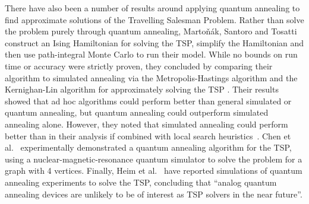 There have also been a number of results around applying quantum annealing to find approximate solutions of the Travelling Salesman Problem. Rather than solve the problem purely through quantum annealing, Marto\v{n}\'ak, Santoro and Tosatti \cite{martonak2004} construct an Ising Hamiltonian for solving the TSP, simplify the Hamiltonian and then use path-integral Monte Carlo \cite{barker1979} to run their model. While no bounds on run time or accuracy were strictly proven, they concluded by comparing their algorithm to simulated annealing via the Metropolis-Hastings algorithm \cite{metropolis1953} and the Kernighan-Lin algorithm for approximately solving the TSP \cite{kernighan1970}. Their results showed that ad hoc algorithms could perform better than general simulated or quantum annealing, but quantum annealing could outperform simulated annealing alone. However, they noted that simulated annealing could perform better than in their analysis if combined with local search heuristics~\cite{martin1996}. Chen et al.\ \cite{chen11} experimentally demonstrated a quantum annealing algorithm for the TSP, using a nuclear-magnetic-resonance quantum simulator to solve the problem for a graph with 4 vertices. Finally, Heim et al.~\cite{heim2017} have reported simulations of quantum annealing experiments to solve the TSP, concluding that ``analog quantum annealing devices are unlikely to be of interest as TSP solvers in the near future''.
